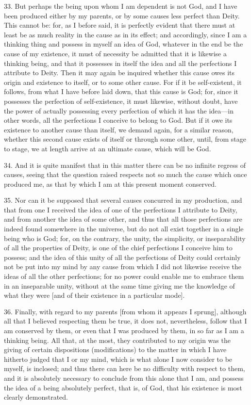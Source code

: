 33. But perhaps the being upon whom I am dependent is not God, and I have been produced either by my parents, or by some causes less perfect than Deity. This cannot be: for, as I before said, it is perfectly evident that there must at least be as much reality in the cause as in its effect; and accordingly, since I am a thinking thing and possess in myself an idea of God, whatever in the end be the cause of my existence, it must of necessity be admitted that it is likewise a thinking being, and that it possesses in itself the idea and all the perfections I attribute to Deity. Then it may again be inquired whether this cause owes its origin and existence to itself, or to some other cause. For if it be self-existent, it follows, from what I have before laid down, that this cause is God; for, since it possesses the perfection of self-existence, it must likewise, without doubt, have the power of actually possessing every perfection of which it has the idea—in other words, all the perfections I conceive to belong to God. But if it owe its existence to another cause than itself, we demand again, for a similar reason, whether this second cause exists of itself or through some other, until, from stage to stage, we at length arrive at an ultimate cause, which will be God.

34. And it is quite manifest that in this matter there can be no infinite regress of causes, seeing that the question raised respects not so much the cause which once produced me, as that by which I am at this present moment conserved.

35. Nor can it be supposed that several causes concurred in my production, and that from one I received the idea of one of the perfections I attribute to Deity, and from another the idea of some other, and thus that all those perfections are indeed found somewhere in the universe, but do not all exist together in a single being who is God; for, on the contrary, the unity, the simplicity, or inseparability of all the properties of Deity, is one of the chief perfections I conceive him to possess; and the idea of this unity of all the perfections of Deity could certainly not be put into my mind by any cause from which I did not likewise receive the ideas of all the other perfections; for no power could enable me to embrace them in an inseparable unity, without at the same time giving me the knowledge of what they were [and of their existence in a particular mode].

36. Finally, with regard to my parents [from whom it appears I sprung], although all that I believed respecting them be true, it does not, nevertheless, follow that I am conserved by them, or even that I was produced by them, in so far as I am a thinking being. All that, at the most, they contributed to my origin was the giving of certain dispositions (modifications) to the matter in which I have hitherto judged that I or my mind, which is what alone I now consider to be myself, is inclosed; and thus there can here be no difficulty with respect to them, and it is absolutely necessary to conclude from this alone that I am, and possess the idea of a being absolutely perfect, that is, of God, that his existence is most clearly demonstrated.

